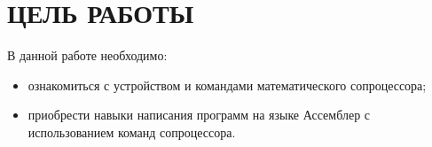 \section{ЦЕЛЬ РАБОТЫ}

В данной работе необходимо:

\begin{itemize}

  \item ознакомиться с устройством и командами математического сопроцессора;

  \item приобрести навыки написания программ на языке Ассемблер 
    с использованием команд сопроцессора.

\end{itemize}

\newpage

